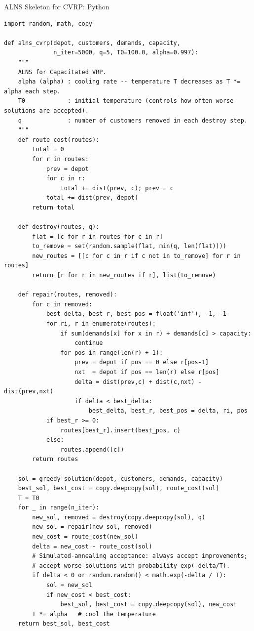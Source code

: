 \documentclass[aspectratio=169,10pt]{beamer}
\begin{document}
\begin{frame}[fragile]{ALNS Skeleton for CVRP: Python}
  \begin{lstlisting}[caption={Adaptive Large Neighbourhood Search (ALNS) skeleton}]
import random, math, copy

def alns_cvrp(depot, customers, demands, capacity,
              n_iter=5000, q=5, T0=100.0, alpha=0.997):
    """
    ALNS for Capacitated VRP.
    alpha (alpha) : cooling rate -- temperature T decreases as T *= alpha each step.
    T0            : initial temperature (controls how often worse solutions are accepted).
    q             : number of customers removed in each destroy step.
    """
    def route_cost(routes):
        total = 0
        for r in routes:
            prev = depot
            for c in r:
                total += dist(prev, c); prev = c
            total += dist(prev, depot)
        return total

    def destroy(routes, q):
        flat = [c for r in routes for c in r]
        to_remove = set(random.sample(flat, min(q, len(flat))))
        new_routes = [[c for c in r if c not in to_remove] for r in routes]
        return [r for r in new_routes if r], list(to_remove)

    def repair(routes, removed):
        for c in removed:
            best_delta, best_r, best_pos = float('inf'), -1, -1
            for ri, r in enumerate(routes):
                if sum(demands[x] for x in r) + demands[c] > capacity:
                    continue
                for pos in range(len(r) + 1):
                    prev = depot if pos == 0 else r[pos-1]
                    nxt  = depot if pos == len(r) else r[pos]
                    delta = dist(prev,c) + dist(c,nxt) - dist(prev,nxt)
                    if delta < best_delta:
                        best_delta, best_r, best_pos = delta, ri, pos
            if best_r >= 0:
                routes[best_r].insert(best_pos, c)
            else:
                routes.append([c])
        return routes

    sol = greedy_solution(depot, customers, demands, capacity)
    best_sol, best_cost = copy.deepcopy(sol), route_cost(sol)
    T = T0
    for _ in range(n_iter):
        new_sol, removed = destroy(copy.deepcopy(sol), q)
        new_sol = repair(new_sol, removed)
        new_cost = route_cost(new_sol)
        delta = new_cost - route_cost(sol)
        # Simulated-annealing acceptance: always accept improvements;
        # accept worse solutions with probability exp(-delta/T).
        if delta < 0 or random.random() < math.exp(-delta / T):
            sol = new_sol
            if new_cost < best_cost:
                best_sol, best_cost = copy.deepcopy(sol), new_cost
        T *= alpha   # cool the temperature
    return best_sol, best_cost
  \end{lstlisting}
\end{frame}
\end{document}

